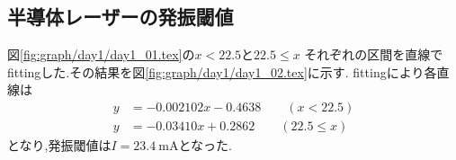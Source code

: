 \subsection{半導体レーザーの発振閾値}
\label{subsec:laser_thresh}
図\ref{fig:graph/day1/day1_01.tex}の$x<22.5$と$22.5\leq x$
それぞれの区間を直線でfittingした.その結果を図\ref{fig:graph/day1/day1_02.tex}に示す.
fittingにより各直線は
\begin{align}
  y&=-0.002102x-0.4638\qquad(x<22.5)\\
  y&=-0.03410x+0.2862\qquad(22.5\leq x)
\end{align}
となり,発振閾値は$I=23.4\ \si{\milli\ampere}$となった.
